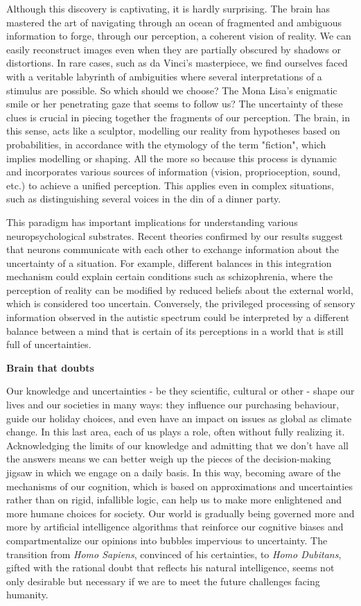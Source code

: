 Although this discovery is captivating, it is hardly surprising. The brain has mastered the art of navigating through an ocean of fragmented and ambiguous information to forge, through our perception, a coherent vision of reality. We can easily reconstruct images even when they are partially obscured by shadows or distortions. In rare cases, such as da Vinci's masterpiece, we find ourselves faced with a veritable labyrinth of ambiguities where several interpretations of a stimulus are possible. So which should we choose? The Mona Lisa's enigmatic smile or her penetrating gaze that seems to follow us? The uncertainty of these clues is crucial in piecing together the fragments of our perception. The brain, in this sense, acts like a sculptor, modelling our reality from hypotheses based on probabilities, in accordance with the etymology of the term "fiction", which implies modelling or shaping. All the more so because this process is dynamic and incorporates various sources of information (vision, proprioception, sound, etc.) to achieve a unified perception. This applies even in complex situations, such as distinguishing several voices in the din of a dinner party.

This paradigm has important implications for understanding various neuropsychological substrates. Recent theories confirmed by our results suggest that neurons communicate with each other to exchange information about the uncertainty of a situation. For example, different balances in this integration mechanism could explain certain conditions such as schizophrenia, where the perception of reality can be modified by reduced beliefs about the external world, which is considered too uncertain. Conversely, the privileged processing of sensory information observed in the autistic spectrum could be interpreted by a different balance between a mind that is certain of its perceptions in a world that is still full of uncertainties.

\textbf{Brain that doubts}

Our knowledge and uncertainties - be they scientific, cultural or other - shape our lives and our societies in many ways: they influence our purchasing behaviour, guide our holiday choices, and even have an impact on issues as global as climate change. In this last area, each of us plays a role, often without fully realizing it. Acknowledging the limits of our knowledge and admitting that we don't have all the answers means we can better weigh up the pieces of the decision-making jigsaw in which we engage on a daily basis. In this way, becoming aware of the mechanisms of our cognition, which is based on approximations and uncertainties rather than on rigid, infallible logic, can help us to make more enlightened and more humane choices for society. Our world is gradually being governed more and more by artificial intelligence algorithms that reinforce our cognitive biases and compartmentalize our opinions into bubbles impervious to uncertainty. The transition from \textit{Homo Sapiens}, convinced of his certainties, to \textit{Homo Dubitans}, gifted with the rational doubt that reflects his natural intelligence, seems not only desirable but necessary if we are to meet the future challenges facing humanity.